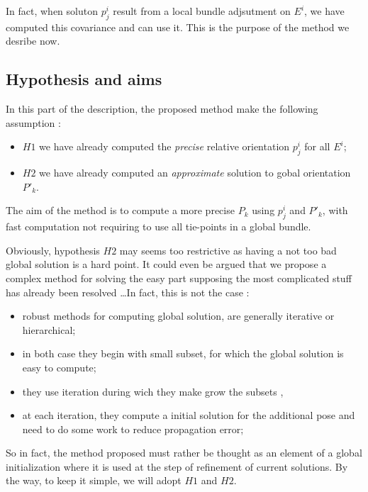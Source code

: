 In fact, when soluton $p^i_j$  result from a local bundle adjsutment on $E^i$,
we have computed this covariance and can use it.
This is the purpose of the method we desribe now.



\subsection{Hypothesis and aims}

In this part of the description, the proposed method make the following assumption :

\begin{itemize}
   \item $H1$ we have already computed the \emph{precise} relative orientation $p^i_j$  for all $E^i$;
   \item $H2$ we have already computed an \emph{approximate} solution to gobal orientation $P'_k$.
\end{itemize}

The aim of the method is to compute a more precise $P_k$ using  $p^i_j$  and $P'_k$, with
fast computation not requiring to use all tie-points in a global bundle.

Obviously, hypothesis $H2$ may seems too restrictive as having a not too bad global solution 
is a hard point.  It could  even be argued that we propose a complex method for solving
the easy part supposing the most complicated stuff has already been resolved \dots   In fact,
this is not the case :

\begin{itemize}
   \item robust methods for computing  global solution, are generally iterative or hierarchical;
   \item in both case they begin with small subset, for which the global solution is easy to compute;
   \item they use iteration during wich  they make grow the subsets , 
   \item at each iteration, they compute a initial solution for the additional pose and need to
         do some work to reduce propagation error;
\end{itemize}

So in fact, the method proposed must rather be thought as an element of a global initialization
where it is used at the step of refinement of current solutions. By the way, to keep it simple,
we will adopt $H1$ and $H2$.


